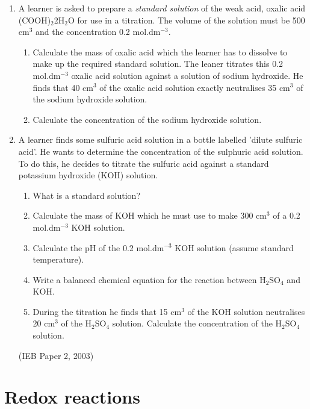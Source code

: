 {\begin{enumerate}
\item{A learner is asked to prepare a \textit{standard solution} of the weak acid, oxalic acid (COOH)$_{2}$2H$_{2}$O for use in a titration. The volume of the solution must be 500 cm$^{3}$ and the concentration 0.2 mol.dm$^{-3}$. 
	\begin{enumerate}
	\item{Calculate the mass of oxalic acid which the learner has to dissolve to make up the required standard solution.}
The leaner titrates this 0.2 mol.dm$^{-3}$ oxalic acid solution against a solution of sodium hydroxide. He finds that 40 cm$^{3}$ of the oxalic acid solution exactly neutralises 35 cm$^{3}$ of the sodium hydroxide solution.
	\item{Calculate the concentration of the sodium hydroxide solution.}
	\end{enumerate}
}

\item{A learner finds some sulfuric acid solution in a bottle labelled 'dilute sulfuric acid'. He wants to determine the concentration of the sulphuric acid solution. To do this, he decides to titrate the sulfuric acid against a standard potassium hydroxide (KOH) solution.

	\begin{enumerate}
	\item{What is a standard solution?}
	\item{Calculate the mass of KOH which he must use to make 300 cm$^{3}$ of a 0.2 mol.dm$^{-3}$ KOH solution.}
	\item{Calculate the pH of the 0.2 mol.dm$^{-3}$ KOH solution (assume standard temperature).}
	\item{Write a balanced chemical equation for the reaction between H$_{2}$SO$_{4}$ and KOH.}
	\item{During the titration he finds that 15 cm$^{3}$ of the KOH solution neutralises 20 cm$^{3}$ of the H$_{2}$SO$_{4}$ solution. Calculate the concentration of the H$_{2}$SO$_{4}$ solution.}
	\end{enumerate}
(IEB Paper 2, 2003)
}

\end{enumerate}
\practiceinfo
}








\section{Redox reactions}
\label{sec:reactiontypes:redox}

